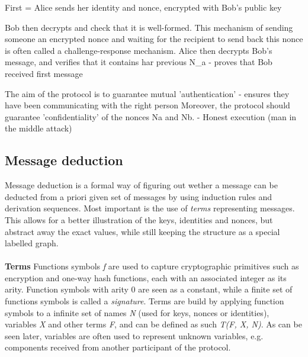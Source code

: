 First 					= Alice sends her identity and nonce, encrypted with Bob's public key

Bob then decrypts and check that it is well-formed.
This mechanism of sending someone an encrypted nonce and waiting for the recipient to send back this nonce is often called a challenge-response mechanism.
Alice then decrypts Bob's message, and verifies that it contains har previous N_a - proves that Bob received first message

The aim of the protocol is to guarantee mutual 'authentication' - ensures they have been communicating with the right person
Moreover, the protocol should guarantee 'confidentiality' of the nonces Na and Nb.
 - Honest execution (man in the middle attack)
\fi

\subsection{Message deduction}
Message deduction is a formal way of figuring out wether a message can be deducted from a priori given set of messages by using induction rules and derivation sequences. Most important is the use of \textit{terms} representing messages. This allows for a better illustration of the keys, identities and nonces, but abstract away the exact values, while still keeping the structure as a special labelled graph. \\ \\
\textbf{Terms} \qquad
Functions symbols \textit{f} are used to capture cryptographic primitives such as encryption and one-way hash functions, each with an associated integer as its arity. Function symbols with arity 0 are seen as a constant, while a finite set of functions symbols is called a \textit{signature}. Terms are build by applying function symbols to a infinite set of names \textit{N} (used for keys, nonces or identities), variables \textit{X} and other terms \textit{F}, and can be defined as such \textit{T(F, X, N)}. As can be seen later, variables are often used to represent unknown variables, e.g. components received from another participant of the protocol. \\

